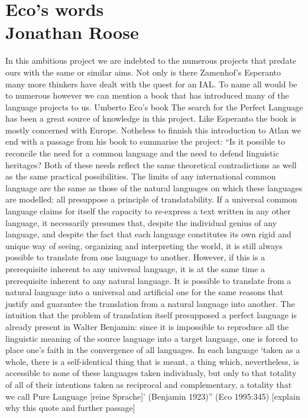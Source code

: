 \section{Eco's words \\ {\small Jonathan Roose}}

In this ambitious project we are indebted to the numerous projects that predate ours with the same or similar aims. Not only is there Zamenhof’s Esperanto many more thinkers have dealt with the quest for an IAL. To name all would be to numerous however we can mention a book that has introduced many of the language projects to us. Umberto Eco’s book The search for the Perfect Language has been a great source of knowledge in this project. Like Esperanto the book is mostly concerned with Europe. Notheless to finnish this introduction to Atlan we end with a passage from his book to summarise the project:
“Is it possible to reconcile the need for a common language and the need to defend linguistic heritages? Both of these needs reflect the same theoretical contradictions as well as the same practical possibilities. The limits of any international common language are the same as those of the natural languages on which these languages are modelled: all presuppose a principle of translatability. If a universal common language claims for itself the capacity to re-express a text written in any other language, it necessarily presumes that, despite the individual genius of any language, and despite the fact that each language constitutes its own rigid and unique way of seeing, organizing and interpreting the world, it is still always possible to translate from one language to another. However, if this is a prerequisite inherent to any universal language, it is at the same time a prerequisite inherent to any natural language. It is possible to translate from a natural language into a universal and artificial one for the same reasons that justify and guarantee the translation from a natural language into another. The intuition that the problem of translation itself presupposed a perfect language is already present in Walter Benjamin: since it is impossible to reproduce all the linguistic meaning of the source language into a target language, one is forced to place one’s faith in the convergence of all languages. In each language ‘taken as a whole, there is a self-identical thing that is meant, a thing which, nevertheless, is accessible to none of these languages taken individualy, but only to that totality of all of their intentions taken as reciprocal and complementary, a totality that we call Pure Language [reine Sprache]’ (Benjamin 1923)” (Eco 1995:345)
[explain why this quote and further passage]

